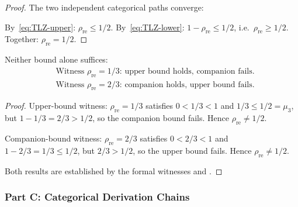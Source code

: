 \begin{proof}
The two independent categorical paths converge:
%
\begin{center}
\end{center}
%
\noindent
By~\cref{eq:TLZ-upper}: $\rho_{\mathrm{re}}\le 1/2$.
By~\cref{eq:TLZ-lower}: $1-\rho_{\mathrm{re}}\le 1/2$, i.e.\
$\rho_{\mathrm{re}}\ge 1/2$. Together: $\rho_{\mathrm{re}}=1/2$. \end{proof}

\begin{proposition}\label{prop:bounds-independent}
Neither bound alone suffices:
\begin{align}
  &\text{Witness $\rho_{\mathrm{re}}=1/3$: upper bound holds,
    companion fails.}
    \label{eq:bound-alone}  \\
  &\text{Witness $\rho_{\mathrm{re}}=2/3$: companion holds,
    upper bound fails.}
    \label{eq:companion-alone}
\end{align}
\end{proposition}

\begin{proof}
Upper-bound witness: $\rho_{\mathrm{re}}=1/3$ satisfies
$0<1/3<1$ and $1/3 \le 1/2 = \mu_3$, but $1-1/3 = 2/3 > 1/2$, so
the companion bound fails.  Hence $\rho_{\mathrm{re}} \ne 1/2$.

Companion-bound witness: $\rho_{\mathrm{re}}=2/3$ satisfies
$0<2/3<1$ and $1-2/3=1/3 \le 1/2$, but $2/3 > 1/2$, so the upper
bound fails.  Hence $\rho_{\mathrm{re}} \ne 1/2$.

Both results are established by the formal witnesses  and .
\end{proof}


\subsubsection{Part C: Categorical Derivation Chains}

